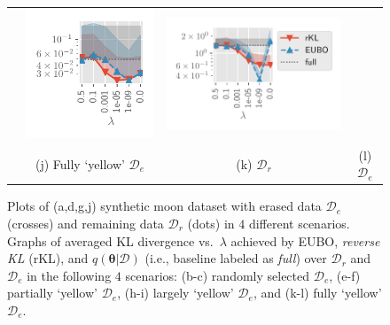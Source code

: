 \documentclass{article}
\theoremstyle{definition}
\newcommand{\mcl}[1]{\mathcal{#1}}
\newcommand{\da}{\mcl{D}}
\newcommand{\dc}{\mcl{D}_r}
\newcommand{\dr}{\mcl{D}_e}
\begin{document}
\begin{figure}
\begin{tabular}{@{}c@{}c@{}c@{}c@{}}
&
\includegraphics[trim={3mm 0mm 3mm 3mm}, clip,height=0.22\textwidth]{img/likelihood_diff/moon_rm_50_gauss_fullcov_likelihood_remain_retrain_f.pdf}
&
\includegraphics[trim={3mm 0mm 3mm 3mm}, clip,height=0.22\textwidth]{img/likelihood_diff/moon_rm_50_gauss_fullcov_likelihood_remove_retrain_f_legend.pdf}
\\
&
(j) Fully `yellow' $\dr$
&
(k) $\dc$
&
(l) $\dr$
\end{tabular}
\caption{Plots of (a,d,g,j) synthetic moon dataset with erased data $\dr$ (crosses) and remaining data $\dc$ (dots) in $4$ different scenarios. Graphs of averaged KL divergence vs.~$\lambda$ achieved by EUBO, \emph{reverse KL} (rKL), and $q(\bm{\theta}|\da)$ (i.e., baseline labeled as \emph{full}) over $\dc$ and $\dr$ in the following $4$ scenarios: (b-c) randomly selected $\dr$, (e-f) partially  `yellow' $\dr$, (h-i) largely `yellow' $\dr$, and (k-l) fully `yellow' $\dr$.}
\label{fig:moon4casemae}
\end{figure}
%
\end{document}
